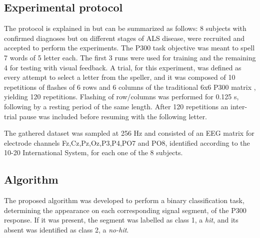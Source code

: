 \documentclass[entropy,article,submit,moreauthors,pdftex,10pt,a4paper]{mdpi}
\begin{document}
\subsection{Experimental protocol}

The protocol is explained in \citep{Riccio2013} but can be summarized as follows:  8 subjects with confirmed diagnoses but on different stages of ALS disease, were recruited and accepted to perform the experiments. The P300 task objective was meant to spell 7 words of 5 letter each.  The first 3 runs were used for training and the remaining 4 for testing with visual feedback.  A trial, for this experiment, was defined as every attempt to select a letter from the speller, and it was composed of 10 repetitions of flashes of 6 rows and 6 columns of the traditional 6x6 P300 matrix , yielding 120 repetitions.  Flashing of row/columns was performed for 0.125 s, following by a resting period of the same length.  After 120 repetitions an inter-trial pause was included before resuming with the following letter.

The gathered dataset was sampled at 256 Hz and consisted of an EEG matrix for electrode channels Fz,Cz,Pz,Oz,P3,P4,PO7 and PO8, identified according to the 10-20 International System,  for each one of the 8 subjects.  


%
%
%
%
%
%
%
%

\subsection{Algorithm}

The proposed algorithm was developed to perform a binary classification task, determining the appearance on each corresponding signal segment, of the P300 response.  If it was present, the segment was labelled as class 1, a \textit{hit}, and its absent was identified as class 2, a \textit{no-hit}.
\end{document}
